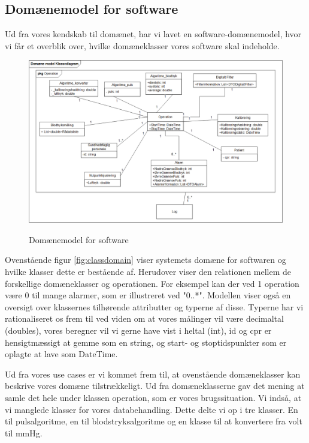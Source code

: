 \subsection{Domænemodel for software}
  
Ud fra vores kendskab til domænet, har vi lavet en software-domænemodel, hvor vi får et overblik over, hvilke domæneklasser vores software skal indeholde. 

\clearpage

\begin{figure}[h!]
	\centering
	\includegraphics[width=1\linewidth]{Arkitektur_og_design/Softwarearkitektur/classdomain}
	\label{fig:classdomain}
	\caption{Domænemodel for software}
\end{figure}

Ovenstående figur \vref{fig:classdomain} viser systemets domæne for softwaren og hvilke klasser dette er bestående af.  Herudover viser den relationen mellem de forskellige domæneklasser og operationen. For eksempel kan der ved 1 operation være 0 til mange alarmer, som er illustreret ved "0..*". Modellen viser også en oversigt over klassernes tilhørende attributter og typerne af disse. Typerne har vi rationaliseret os frem til ved viden om at vores målinger vil være decimaltal (doubles), vores beregner vil vi gerne have vist i heltal (int), id og cpr er hensigtmæssigt at gemme som en string, og start- og stoptidspunkter som er oplagte at lave som DateTime. 

Ud fra vores use cases er vi kommet frem til, at ovenstående domæneklasser kan beskrive vores domæne tilstrækkeligt.  Ud fra domæneklasserne gav det mening at samle det hele under klassen operation, som er vores brugssituation. Vi indså, at vi manglede klasser for vores databehandling. Dette delte vi op i tre klasser. En til pulsalgoritme, en til blodstryksalgoritme og en klasse til at konvertere fra volt til mmHg. 

